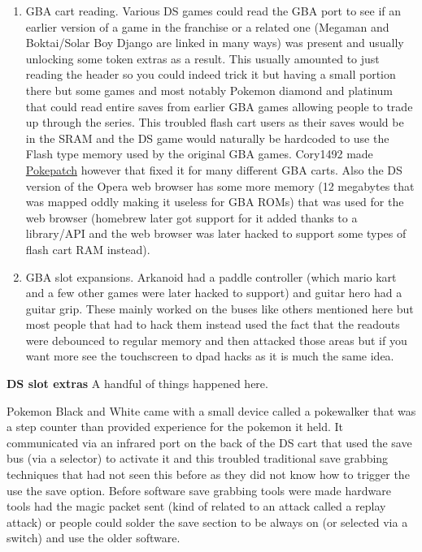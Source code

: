 \documentclass[
]{book}
\providecommand{\tightlist}{%
  \setlength{\itemsep}{0pt}\setlength{\parskip}{0pt}}
\begin{document}
\begin{enumerate}
\def\labelenumi{\arabic{enumi}.}
\tightlist
\item
  GBA cart reading. Various DS games could read the GBA port to see if an earlier version of a game in the franchise or a related one (Megaman and Boktai/Solar Boy Django are linked in many ways) was present and usually unlocking some token extras as a result. This usually amounted to just reading the header so you could indeed trick it but having a small portion there but some games and most notably Pokemon diamond and platinum that could read entire saves from earlier GBA games allowing people to trade up through the series. This troubled flash cart users as their saves would be in the SRAM and the DS game would naturally be hardcoded to use the Flash type memory used by the original GBA games. Cory1492 made \href{http://filetrip.net/nds-downloads/rom-hacks/download-pokepatch-42-f27240.html}{Pokepatch} however that fixed it for many different GBA carts. Also the DS version of the Opera web browser has some more memory (12 megabytes that was mapped oddly making it useless for GBA ROMs) that was used for the web browser (homebrew later got support for it added thanks to a library/API and the web browser was later hacked to support some types of flash cart RAM instead).
\item
  GBA slot expansions. Arkanoid had a paddle controller (which mario kart and a few other games were later hacked to support) and guitar hero had a guitar grip. These mainly worked on the buses like others mentioned here but most people that had to hack them instead used the fact that the readouts were debounced to regular memory and then attacked those areas but if you want more see the touchscreen to dpad hacks as it is much the same idea.
\end{enumerate}

\textbf{DS slot extras} A handful of things happened here.

Pokemon Black and White came with a small device called a pokewalker that was a step counter than provided experience for the pokemon it held. It communicated via an infrared port on the back of the DS cart that used the save bus (via a selector) to activate it and this troubled traditional save grabbing techniques that had not seen this before as they did not know how to trigger the use the save option. Before software save grabbing tools were made hardware tools had the magic packet sent (kind of related to an attack called a replay attack) or people could solder the save section to be always on (or selected via a switch) and use the older software.
\end{document}
